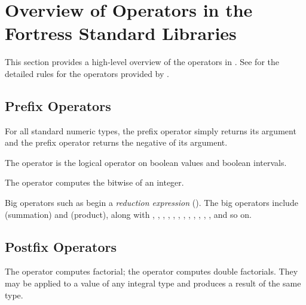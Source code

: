 %
%
%
%

\section{Overview of Operators in the Fortress Standard Libraries}


This section provides a high-level overview of the operators in
\library.
See  for the detailed rules for the operators
provided by \library.

\subsection{Prefix Operators}

For all standard numeric types, the prefix operator \EXP{+} simply returns its
argument and the prefix operator \EXP{-} returns the negative of its argument.

The operator \EXP{\neg} is the logical  operator on boolean values
and boolean intervals.

The operator \EXP{\twointersectnot} computes the bitwise  of
an integer.

Big operators such as \EXP{\sum} begin a \emph{reduction expression}
().  The big operators include \EXP{\sum}
(summation) and \EXP{\prod} (product), along with \EXP{\bigcap},
\EXP{\bigcup}, \EXP{\bigwedge}, \EXP{\bigvee},
\EXP{\underline{\bigvee}}, \EXP{\bigoplus},
\EXP{\bigotimes}, \EXP{\biguplus}, \EXP{\displaystyle\boxplus},
\EXP{\displaystyle\boxtimes}, , , and so on.

\subsection{Postfix Operators}

The operator \EXP{!} computes factorial; the operator \EXP{!!}
computes double factorials.
They may be applied to a value of any integral type and produces a
result of the same type.

